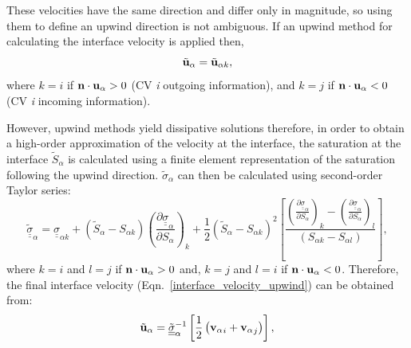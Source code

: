 \documentclass[times]{fldauth}
\newcommand{\frc}{\displaystyle\frac}
\begin{document}
These velocities have the same direction and differ only in magnitude, so using them to define an upwind direction is not ambiguous. If an upwind method for calculating the interface velocity is applied then,
\begin{equation}
  {\tilde{\bf u}}_{\alpha} = \tilde{\bf u}_{\alpha k},\label{interface_velocity_upwind}
\end{equation}
where $k=i$ if ${\bf n}\cdot{\bf u}_{\alpha}>0$ (CV {\it i} outgoing information), and $k=j$ if ${\bf n}\cdot{\bf u}_{\alpha}<0$ (CV {\it i} incoming information). 

However, upwind methods yield dissipative solutions therefore, in order to obtain a high-order approximation of the velocity at the interface, the saturation at the interface $\tilde{S}_{\alpha}$ is calculated using a finite element representation of the saturation following the upwind direction. $\tilde \sigma_{\alpha}$ can then be calculated using second-order Taylor series:
\begin{equation}
  \underline{\underline{\tilde{\sigma}}}_{\alpha} =
  \underline{\underline{\sigma}}_{\alpha k} +
  \left(\tilde{S}_{\alpha}-S_{\alpha k}\right) \left(\frc{\partial
    \underline{\underline{\sigma}}_{\alpha}}{\partial
    S_{\alpha}}\right)_{k} +
  \frc{1}{2}\left(\tilde{S}_{\alpha}-S_{\alpha k}\right)^{2} \left[
    \frc{ \left(\frc{\partial
        \underline{\underline{\sigma}}_{\alpha}}{\partial
        S_{\alpha}}\right)_{k} - \left(\frc{\partial
        \underline{\underline{\sigma}}_{\alpha}}{\partial
        S_{\alpha}}\right)_{l} } { \left(S_{\alpha k}-S_{\alpha
        l}\right) } \right],
  \label{sigma-out}
\end{equation}
where $k=i$ and $l=j$ if ${\bf n}\cdot{\bf u}_{\alpha}>0$ and, $k=j$ and $l=i$ if ${\bf n}\cdot{\bf u}_{\alpha}<0$. Therefore, the final interface velocity (Eqn.~\ref{interface_velocity_upwind}) can be obtained from:
\begin{equation}
  {\tilde{\bf u}_{\alpha}} = \underline{\underline{\tilde{\sigma}}}_{\alpha}^{-1} \left[\displaystyle\frac{1}{2} \left( {{\bf v}_\alpha}_i + {{\bf v}_\alpha}_j \right)\right], \label{mean_int_vel}  
\end{equation} 
\end{document}
